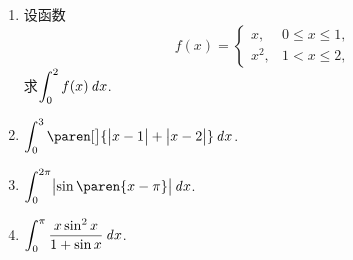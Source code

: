 \documentclass[a4paper,punct=CCT]{ctexbook}
\theoremstyle{break}
\newif\ifshowsol
\let\leq\leqslant
\let\le\leq
\begin{document}
\begin{enumerate}
\item 设函数
  \[
    f(x) =
    \begin{cases}
      x, & 0 \le x \le 1, \\
      x^2, & 1 < x \le 2,
    \end{cases}
  \]
  求\(\displaystyle \int_0^2 f(x) \mathop{}\!\mathit{d} x\).

  \ifshowsol
  \[
    \int_0^2 f(x) \dx
    = \int_0^1 f(x) \dx + \int_1^2 f(x) \dx
    = \frac{x^2}{2} \bigg\vert_0^1 + \frac{x^3}{3} \bigg\vert_1^2
    = \frac{17}{6}.
  \]
  \fi

\item \(\displaystyle \int_0^3 \paren[\big]{\abs[\big]{x-1} + \abs[\big]{x-2}} \dx\).

  \ifshowsol
  \[
    \begin{split}
      \int_0^3 \paren[\big]{\abs[\big]{x-1} + \abs[\big]{x-2}} \dx
      &= \int_0^1 \paren{3-2x} \dx + \int_1^2 \dx + \int_2^3 \paren{2x-3} \dx \\
      &= \paren{3x-x^2} \Big\vert_0^1 + 1 + \paren{x^2 - 3x} \Big\vert_2^3 \\
      &= 2 + 1 + 2 = 5.
    \end{split}
  \]
  \fi

\item \(\displaystyle \int_0^{2\pi} \abs[\big]{\sin\paren{x-\pi}} \dx\).

  \ifshowsol
  \[
    \int_0^{2\pi} \abs[\big]{\sin\paren{x-\pi}} \dx
    = \int_0^{2\pi} \abs[\big]{- \sin x} \dx
    = \int_0^{2\pi} \abs[\big]{\sin x} \dx
    = 2 \int_0^{\pi} \abs[\big]{\sin x} \dx
    = 2 \int_0^{\pi} \sin x \dx
    = 4.
  \]
  \fi

\item \(\displaystyle \int_0^\pi \frac{x \sin^2 x}{1 + \sin x} \mathop{}\!\mathit{d} x\).


\end{enumerate}
\end{document}
